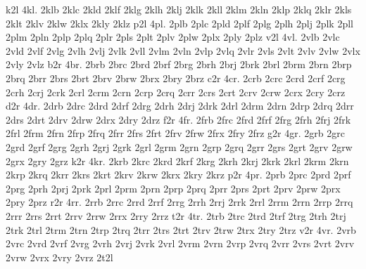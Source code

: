 {k2l 4kl. 2klb 2klc 2kld 2klf 2klg 2klh 2klj 2klk 2kll 2klm 2kln 2klp 2klq 2klr 2kls 2klt 2klv 2klw 2klx 2kly 2klz
p2l 4pl. 2plb 2plc 2pld 2plf 2plg 2plh 2plj 2plk 2pll 2plm 2pln 2plp 2plq 2plr 2pls 2plt 2plv 2plw 2plx 2ply 2plz
v2l 4vl. 2vlb 2vlc 2vld 2vlf 2vlg 2vlh 2vlj 2vlk 2vll 2vlm 2vln 2vlp 2vlq 2vlr 2vls 2vlt 2vlv 2vlw 2vlx 2vly 2vlz
b2r 4br. 2brb 2brc 2brd 2brf 2brg 2brh 2brj 2brk 2brl 2brm 2brn 2brp 2brq 2brr 2brs 2brt 2brv 2brw 2brx 2bry 2brz
c2r 4cr. 2crb 2crc 2crd 2crf 2crg 2crh 2crj 2crk 2crl 2crm 2crn 2crp 2crq 2crr 2crs 2crt 2crv 2crw 2crx 2cry 2crz
d2r 4dr. 2drb 2drc 2drd 2drf 2drg 2drh 2drj 2drk 2drl 2drm 2drn 2drp 2drq 2drr 2drs 2drt 2drv 2drw 2drx 2dry 2drz
f2r 4fr. 2frb 2frc 2frd 2frf 2frg 2frh 2frj 2frk 2frl 2frm 2frn 2frp 2frq 2frr 2frs 2frt 2frv 2frw 2frx 2fry 2frz
g2r 4gr. 2grb 2grc 2grd 2grf 2grg 2grh 2grj 2grk 2grl 2grm 2grn 2grp 2grq 2grr 2grs 2grt 2grv 2grw 2grx 2gry 2grz
k2r 4kr. 2krb 2krc 2krd 2krf 2krg 2krh 2krj 2krk 2krl 2krm 2krn 2krp 2krq 2krr 2krs 2krt 2krv 2krw 2krx 2kry 2krz
p2r 4pr. 2prb 2prc 2prd 2prf 2prg 2prh 2prj 2prk 2prl 2prm 2prn 2prp 2prq 2prr 2prs 2prt 2prv 2prw 2prx 2pry 2prz
r2r 4rr. 2rrb 2rrc 2rrd 2rrf 2rrg 2rrh 2rrj 2rrk 2rrl 2rrm 2rrn 2rrp 2rrq 2rrr 2rrs 2rrt 2rrv 2rrw 2rrx 2rry 2rrz
t2r 4tr. 2trb 2trc 2trd 2trf 2trg 2trh 2trj 2trk 2trl 2trm 2trn 2trp 2trq 2trr 2trs 2trt 2trv 2trw 2trx 2try 2trz
v2r 4vr. 2vrb 2vrc 2vrd 2vrf 2vrg 2vrh 2vrj 2vrk 2vrl 2vrm 2vrn 2vrp 2vrq 2vrr 2vrs 2vrt 2vrv 2vrw 2vrx 2vry 2vrz
2t2l}